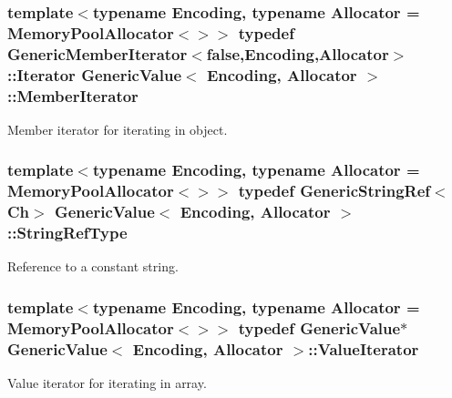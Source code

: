 \subsubsection[{\texorpdfstring{Member\+Iterator}{MemberIterator}}]{\setlength{\rightskip}{0pt plus 5cm}template$<$typename Encoding, typename Allocator = Memory\+Pool\+Allocator$<$$>$$>$ typedef {\bf Generic\+Member\+Iterator}$<$false,Encoding,Allocator$>$\+::Iterator {\bf Generic\+Value}$<$ Encoding, Allocator $>$\+::{\bf Member\+Iterator}}\hypertarget{classGenericValue_a349b8faae61edc42b4289726820be439}{}\label{classGenericValue_a349b8faae61edc42b4289726820be439}


Member iterator for iterating in object. 

\subsubsection[{\texorpdfstring{String\+Ref\+Type}{StringRefType}}]{\setlength{\rightskip}{0pt plus 5cm}template$<$typename Encoding, typename Allocator = Memory\+Pool\+Allocator$<$$>$$>$ typedef {\bf Generic\+String\+Ref}$<${\bf Ch}$>$ {\bf Generic\+Value}$<$ Encoding, Allocator $>$\+::{\bf String\+Ref\+Type}}\hypertarget{classGenericValue_a32e0f30ee278072374c8168b14d3317f}{}\label{classGenericValue_a32e0f30ee278072374c8168b14d3317f}


Reference to a constant string. 

\subsubsection[{\texorpdfstring{Value\+Iterator}{ValueIterator}}]{\setlength{\rightskip}{0pt plus 5cm}template$<$typename Encoding, typename Allocator = Memory\+Pool\+Allocator$<$$>$$>$ typedef {\bf Generic\+Value}$\ast$ {\bf Generic\+Value}$<$ Encoding, Allocator $>$\+::{\bf Value\+Iterator}}\hypertarget{classGenericValue_aee30721a49688ba0f865f5d581eb6be9}{}\label{classGenericValue_aee30721a49688ba0f865f5d581eb6be9}


Value iterator for iterating in array. 



